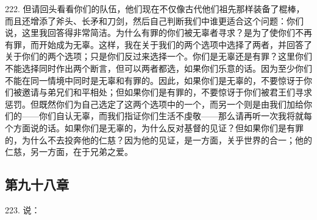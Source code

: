 222. 但请回头看看你们的队伍，他们现在不仅像古代他们祖先那样装备了棍棒，而且还增添了斧头、长矛和刀剑，然后自己判断我们中谁更适合这个问题：你们说，这里我回答得非常简洁。为什么有罪的你们被无辜者寻求？是为了使你们不再有罪，而开始成为无辜。这样，我在关于我们的两个选项中选择了两者，并回答了关于你们的两个选项；只是你们反过来选择一个。你们是无辜还是有罪？这里你们不能选择同时作出两个断言，但可以两者都选，如果你们乐意的话。因为至少你们不能在同一情境中同时是无辜和有罪的。因此，如果你们是无辜的，不要惊讶于你们被邀请与弟兄们和平相处；但如果你们是有罪的，不要惊讶于你们被君王们寻求惩罚。但既然你们为自己选定了这两个选项中的一个，而另一个则是由我们加给你们的——你们自认无辜，而我们指证你们生活不虔敬——那么请再听一次我将就每个方面说的话。如果你们是无辜的，为什么反对基督的见证？但如果你们是有罪的，为什么不去投奔他的仁慈？因为他的见证，是一方面，关乎世界的合一；他的仁慈，另一方面，在于兄弟之爱。\par


\subsection{第九十八章}

223. 说：\par

